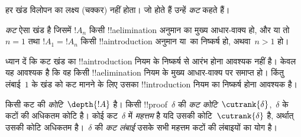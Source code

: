 \documentclass[../../../include/open-logic-section]{subfiles}
\begin{document}
हर खंड विलोपन का लक्ष्य (चक्कर) नहीं होता। जो होते हैं उन्हें \emph{कट} कहते
हैं।

\begin{defn}
\emph{कट} ऐसा खंड है जिसमें $!A_n$ किसी !!a{elimination} अनुमान का मुख्य
आधार-वाक्य हो, और या तो $n=1$ तथा $!A_1 = !A_n$ किसी !!a{introduction}
अनुमान या~\FalseInt का निष्कर्ष हो, अथवा~$n>1$ हो।
\end{defn}

ध्यान दें कि कट खंड का !!a{introduction} नियम के निष्कर्ष से आरंभ होना आवश्यक
नहीं है। केवल यह आवश्यक है कि वह किसी !!a{elimination} नियम के मुख्य
आधार-वाक्य पर समाप्त हो। किंतु लंबाई~$1$ के खंड को कट मानने के लिए उसका
!!{introduction} नियम का निष्कर्ष होना आवश्यक है।

\begin{defn}
किसी कट की \emph{कोटि}~$\depth{!A}$ है। किसी !!{proof}~$\delta$ की
\emph{कट कोटि}~$\cutrank{\delta}$,~$\delta$ के कटों की अधिकतम कोटि है। कोई
कट~$\delta$ में \emph{महत्तम} है यदि उसकी कोटि~$\cutrank{\delta}$ है, अर्थात्
उसकी कोटि अधिकतम है।~$\delta$ की \emph{कट लंबाई} उसके सभी महत्तम कटों की
लंबाइयों का योग है।
\end{defn}
\end{document}
